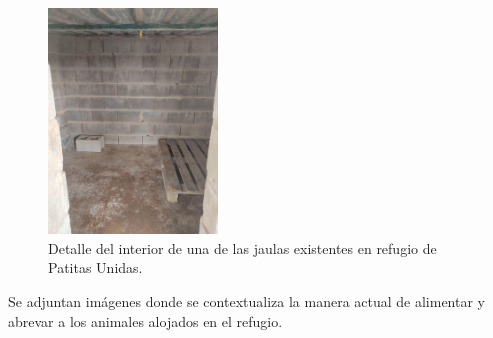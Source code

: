 \documentclass[12pt]{article}
\begin{document}
	\begin{figure}[h!]
		\begin{center}
			\includegraphics[width=0.4\textwidth]{img/refugio_jaulas_detalleInterior.jpg}
			\caption{Detalle del interior de una de las jaulas existentes en refugio de Patitas Unidas.}
			\label{Foto jaulas refugio detalle interior}
		\end{center}
	\end{figure}

	\noindent Se adjuntan imágenes donde se contextualiza la manera actual de alimentar y abrevar a los animales alojados en el refugio. \\
	
	\pagebreak
	
\end{document}
